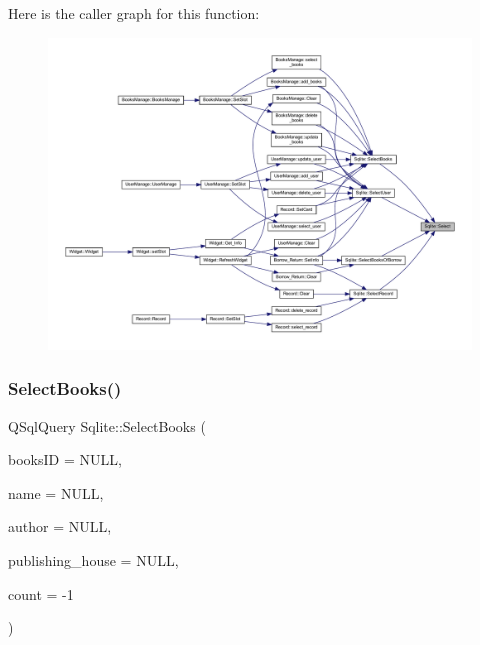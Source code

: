 Here is the caller graph for this function\+:
\nopagebreak
\begin{figure}[H]
\begin{center}
\leavevmode
\includegraphics[width=350pt]{class_sqlite_a9a39cca147a504c82e98261707aa1e8d_icgraph}
\end{center}
\end{figure}
\mbox{\label{class_sqlite_addc1fbbdf661fd568535ddea8280fbd2}} 
\subsubsection{\texorpdfstring{SelectBooks()}{SelectBooks()}}
{\footnotesize\ttfamily Q\+Sql\+Query Sqlite\+::\+Select\+Books (\begin{DoxyParamCaption}\item[{Q\+String}]{books\+ID = {\ttfamily NULL},  }\item[{Q\+String}]{name = {\ttfamily NULL},  }\item[{Q\+String}]{author = {\ttfamily NULL},  }\item[{Q\+String}]{publishing\+\_\+house = {\ttfamily NULL},  }\item[{int}]{count = {\ttfamily -\/1} }\end{DoxyParamCaption})}

